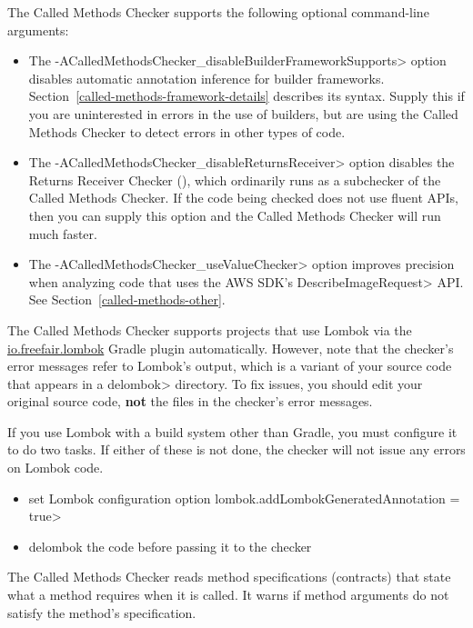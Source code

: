 The Called Methods Checker supports the following optional command-line arguments:
\begin{itemize}
\item The \<-ACalledMethodsChecker\_disableBuilderFrameworkSupports> option disables automatic
 annotation inference for builder frameworks.
 Section~\ref{called-methods-framework-details} describes its syntax.
 Supply this if you are uninterested in errors in the use of builders, but
 are using the Called Methods Checker to detect errors in other types of
 code.
\item The \<-ACalledMethodsChecker\_disableReturnsReceiver> option disables
  the Returns Receiver Checker (),
  which ordinarily runs as a subchecker of the Called Methods Checker.  If
  the code being checked does not use fluent APIs, then you can supply this
  option and the Called Methods Checker will run much faster.
\item The \<-ACalledMethodsChecker\_useValueChecker> option improves precision when analyzing
 code that uses the AWS SDK's \<DescribeImageRequest> API\@.  See
 Section~\ref{called-methods-other}.
\end{itemize}


The Called Methods Checker supports projects that use Lombok via
the \href{https://plugins.gradle.org/plugin/io.freefair.lombok}{io.freefair.lombok} Gradle plugin automatically.
However, note that the checker's error messages refer to Lombok's output, which is a variant of your source code
that appears in a \<delombok> directory.
To fix issues, you should edit your original source code, \textbf{not} the files in the checker's error messages.

If you use Lombok with a build system other than Gradle, you must configure it to do two tasks.
If either of these is not done, the checker will not issue any errors on Lombok code.
\begin{itemize}
\item set Lombok configuration option \<lombok.addLombokGeneratedAnnotation = true>
\item delombok the code before passing it to the checker
\end{itemize}



The Called Methods Checker reads method specifications (contracts) that
state what a method requires when it is called.  It warns if method
arguments do not satisfy the method's specification.

